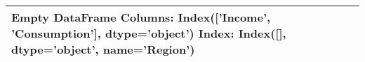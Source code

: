 \begin{tabular}{lrr}
\toprule
Empty DataFrame
Columns: Index(['Income', 'Consumption'], dtype='object')
Index: Index([], dtype='object', name='Region') \\
\bottomrule
\end{tabular}
